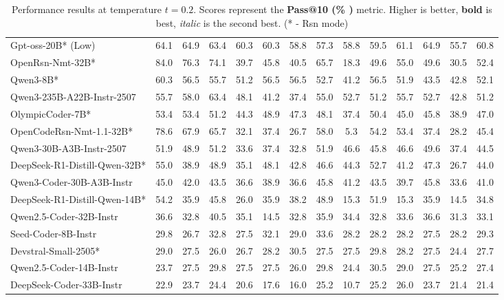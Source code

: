 \documentclass{llmxive}
\begin{document}
\begin{table}[hbt]
{\begin{tabular}{l *{13}{c}}
\rowcolor{gray!10}
Gpt-oss-20B* (Low) & 	64.1& 	64.9& 	63.4& 	60.3& 	60.3& 	58.8& 	57.3& 	58.8& 	59.5& 	61.1& 	64.9& 	55.7& 	60.8\\												
OpenRsn-Nmt-32B* & 	84.0& 	76.3& 	74.1& 	39.7& 	45.8& 	40.5& 	65.7& 	18.3& 	49.6& 	55.0& 	49.6& 	30.5& 	52.4\\												
\rowcolor{gray!10}
Qwen3-8B* & 	60.3& 	56.5& 	55.7& 	51.2& 	56.5& 	56.5& 	52.7& 	41.2& 	56.5& 	51.9& 	43.5& 	42.8& 	52.1\\												
Qwen3-235B-A22B-Instr-2507&	55.7& 	58.0& 	63.4& 	48.1& 	41.2& 	37.4& 	55.0& 	52.7& 	51.2& 	55.7& 	52.7& 	42.8& 	51.2\\											
\rowcolor{gray!10}
OlympicCoder-7B* & 	53.4& 	53.4& 	51.2& 	44.3& 	48.9& 	47.3& 	48.1& 	37.4& 	50.4& 	45.0& 	45.8& 	38.9& 	47.0\\												
OpenCodeRsn-Nmt-1.1-32B* & 	78.6& 	67.9& 	65.7& 	32.1& 	37.4& 	26.7& 	58.0& 	5.3& 	54.2& 	53.4& 	37.4& 	28.2& 	45.4\\									
\rowcolor{gray!10}
Qwen3-30B-A3B-Instr-2507&	51.9& 	48.9& 	51.2& 	33.6& 	37.4& 	32.8& 	51.9& 	46.6& 	45.8& 	46.6& 	49.6& 	37.4& 	44.5\\												
DeepSeek-R1-Distill-Qwen-32B* & 	55.0& 	38.9& 	48.9& 	35.1& 	48.1& 	42.8& 	46.6& 	44.3& 	52.7& 	41.2& 	47.3& 	26.7& 	44.0\\										
\rowcolor{gray!10}
Qwen3-Coder-30B-A3B-Instr & 	45.0& 	42.0& 	43.5& 	36.6& 	38.9& 	36.6& 	45.8& 	41.2& 	43.5& 	39.7& 	45.8& 	33.6& 	41.0\\												
DeepSeek-R1-Distill-Qwen-14B* & 	54.2& 	35.9& 	45.8& 	26.0& 	35.9& 	38.2& 	48.9& 	15.3& 	51.9& 	15.3& 	35.9& 	14.5& 	34.8\\											
\rowcolor{gray!10}
Qwen2.5-Coder-32B-Instr & 	36.6& 	32.8& 	40.5& 	35.1& 	14.5& 	32.8& 	35.9& 	34.4& 	32.8& 	33.6& 	36.6& 	31.3& 	33.1\\												
Seed-Coder-8B-Instr & 	29.8& 	26.7& 	32.8& 	27.5& 	32.1& 	29.0& 	33.6& 	28.2& 	28.2& 	28.2& 	27.5& 	28.2& 	29.3\\												
\rowcolor{gray!10}
Devstral-Small-2505* & 	29.0& 	27.5& 	26.0& 	26.7& 	28.2& 	30.5& 	27.5& 	27.5& 	29.8& 	28.2& 	27.5& 	24.4& 	27.7\\												
Qwen2.5-Coder-14B-Instr & 	23.7& 	27.5& 	29.8& 	27.5& 	27.5& 	26.0& 	29.8& 	24.4& 	30.5& 	29.0& 	27.5& 	25.2& 	27.4\\												
\rowcolor{gray!10}
DeepSeek-Coder-33B-Instr & 	22.9& 	23.7& 	24.4& 	20.6& 	17.6& 	16.0& 	25.2& 	10.7& 	25.2& 	26.0& 	23.7& 	21.4& 	21.4\\												

\bottomrule
\end{tabular}
}
\caption{Performance results at temperature $t=0.2$. Scores represent the \textbf{Pass@10 (\% )} metric. Higher is better, \textbf{bold} is best, \textit{italic} is the second best. (* - Rsn mode)}
\label{tab_exps_feb25_pass10_t0.2}
\end{table}
\end{document}
